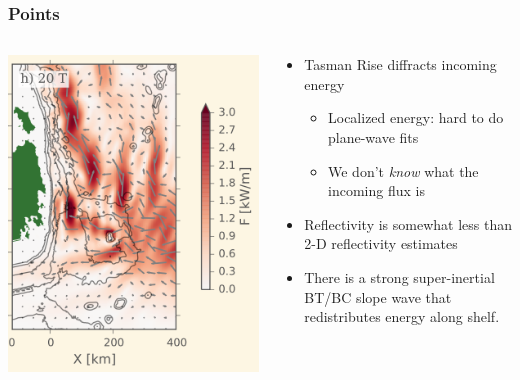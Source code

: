 \documentclass[aspectratio=169]{beamer}
\begin{document}
\begin{frame}
  \frametitle{Points}
  \begin{columns}
    \begin{column}{0.4\textwidth}
      \includegraphics[width=\textwidth]{doc/Tide20Full.png}
      
    \end{column}
    \begin{column}{0.5\textwidth}
      \begin{itemize}
        \item<1-> Tasman Rise diffracts incoming energy
          \begin{itemize}
             \item<1-> Localized energy: hard to do plane-wave fits
             \item<1-> We don't \emph{know} what the incoming flux is
          \end{itemize}
        \item<2-> Reflectivity is somewhat less than 2-D reflectivity estimates
        \item<3-> There is a strong super-inertial BT/BC slope wave that redistributes energy along shelf.
      \end{itemize}
    \end{column}
  \end{columns}
\end{frame}
\end{document}
